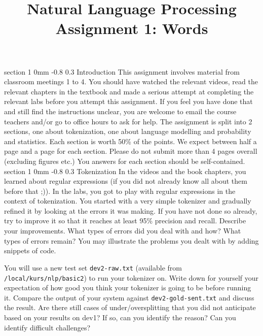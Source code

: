 \documentclass[11pt]{article}
\title{{\LARGE Natural Language Processing}\\[1.5mm]{\large Assignment 1: Words}}
\author{}
\date{} %
\makeatletter
\renewcommand{\section}{\@startsection
{section}%
{1}%
{0mm}%
{-0.8\baselineskip}%
{0.3\baselineskip}%
{\bfseries\large}}%
\makeatother
\begin{document}


\maketitle
\thispagestyle{empty}
\section{Introduction}
\indent This assignment involves material from classroom meetings 1 to
4. You should have watched the relevant videos, read the relevant
chapters in the textbook and made a serious attempt at completing the
relevant labs before you attempt this assignment. If you feel you have
done that and still find the instructions unclear, you are welcome to
email the course teachers and/or go to office hours to ask for
help.  The assignment is split into 2 sections, one about
tokenization, one about language modelling and probability and
statistics. Each section is worth 50\% of the points. We expect between half a
page and a page for each section. Please do not submit more than 4
pages overall (excluding figures etc.) You answers %
for each section should be self-contained.
\section{Tokenization}
In the videos and the book chapters, you learned about regular
expressions (if you did not already know all about them before that
;)). In the labs, you got to play with regular expressions in the
context of tokenization.  You started with a very simple tokenizer and
gradually refined it by looking at the errors it was making.  If you
have not done so already, try to improve it so that it reaches at
least 95\% precision and recall. Describe your improvements. 
What types of errors did you deal with and how? What types of errors 
remain? You may illustrate the problems you dealt with by adding snippets
of code.

You will use a new test set {\tt dev2-raw.txt} (available from {\tt
  /local/kurs/nlp/basic2}) to run your tokenizer on. Write down for
yourself your expectation of how good you think your tokenizer is
going to be before running it.  Compare the output of your system
against {\tt dev2-gold-sent.txt} and discuss the result. Are there
still cases of under/oversplitting that you did not anticipate based 
on your results on dev1? If so, can you identify the
reason? Can you identify difficult challenges?
\end{document}
